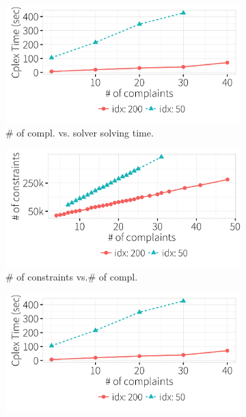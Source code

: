 \begin{figure}[t]
    \begin{subfigure} [t]{.3\textwidth}
    \includegraphics[width = .99\columnwidth]{figures/num_compl_time}
    \vspace*{-.25in}
    \caption{\# of compl. vs. solver solving time.}
    \vspace*{-.1in}
    \label{f:compl_vs_time} 
    \end{subfigure} 
    \iffalse
    \begin{subfigure} [t]{.3\textwidth}
    \includegraphics[width = .99\columnwidth]{figures/num_compl_cons}
    \vspace*{-.25in}
    \caption{\# of constraints vs.\# of compl.}
    \vspace*{-.1in}
    \label{f:compl_vs_cons} 
    \end{subfigure}
    \begin{subfigure} [t]{.3\textwidth}
    \includegraphics[width = .99\columnwidth]{figures/num_compl_time}

\end{subfigure}
\end{figure}
